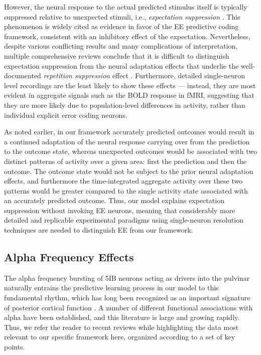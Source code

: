 \documentclass[11pt,twoside]{article}
\newif\myifpdf
\begin{document}
However, the neural response to the actual predicted stimulus itself is typically suppressed relative to unexpected stimuli, i.e., \emph{expectation suppression} \citep{SummerfieldTrittschuhMontiEtAl08,TodorovicEdeMarisEtAl11,MeyerOlson11,BastosUsreyAdamsEtAl12}.  This phenomenon is widely cited as evidence in favor of the EE predictive coding framework, consistent with an inhibitory effect of the expectation.  Nevertheless, despite various conflicting results and many complications of interpretation, multiple comprehensive reviews conclude that it is difficult to distinguish expectation suppression from the neural adaptation effects that underlie the well-documented \emph{repetition suppression} effect \citep{WalshMcGovernClarkEtAl20,VinkenVogels17,KokLange15,KokJeheedeLange12,SummerfieldEgner09,LeeMumford03}.  Furthermore, detailed single-neuron level recordings are the least likely to show these effects --- instead, they are most evident in aggregate signals such as the BOLD response in fMRI, suggesting that they are more likely due to population-level differences in activity, rather than individual explicit error coding neurons.

As noted earlier, in our framework accurately predicted outcomes would result in a continued adaptation of the neural response carrying over from the prediction to the outcome state, whereas unexpected outcomes would be associated with two distinct patterns of activity over a given area: first the prediction and then the outcome.  The outcome state would not be subject to the prior neural adaptation effects, and furthermore the time-integrated aggregate activity over these two patterns would be greater compared to the single activity state associated with an accurately predicted outcome.  Thus, our model explains expectation suppression without invoking EE neurons, meaning that considerably more detailed and replicable experimental paradigms using single-neuron resolution techniques are needed to distinguish EE from our framework.

\subsection{Alpha Frequency Effects}

The alpha frequency bursting of 5IB neurons acting as drivers into the pulvinar naturally entrains the predictive learning process in our model to this fundamental rhythm, which has long been recognized as an important signature of posterior cortical function \citep{Berger29,Walter53,NunnOsselton74,VarelaToroJohnEtAl81,VanRullenKoch03}.  A number of different functional associations with alpha have been established, and this literature is large and growing rapidly.  Thus, we refer the reader to recent reviews \citep{JensenBonnefondMarshallEtAl15,VanRullen16,ClaytonYeungKadosh18,FosterAwh19} while highlighting the data most relevant to our specific framework here, organized according to a set of key points.
\end{document}
